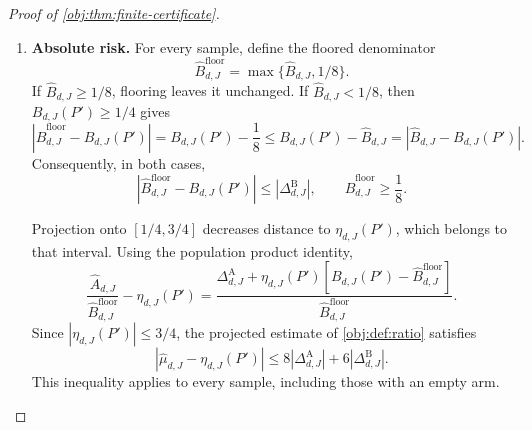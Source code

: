 \begin{proof}[Proof of \cref{obj:thm:finite-certificate}]
\begin{enumerate}
For \(x\in[0,1]\), reflection preserves the distance from zero. Thus
\cref{obj:ass:mean-holder} gives
\[
|\mu_d(P',s_dx)-\mu_d(P',0)|\le2x^\beta.
\]
Subtracting the cutoff mean inside the weighted integral yields
\[
\eta_{d,J}(P')-\mu_d(P',0)
=
\frac{
\int_0^1K_J(x)f(P',s_dx)
[\mu_d(P',s_dx)-\mu_d(P',0)]\,dx
}{B_{d,J}(P')}.
\]
The numerator satisfies
\[
\begin{aligned}
\left|
\int_0^1K_J(x)f(P',s_dx)
[\mu_d(P',s_dx)-\mu_d(P',0)]\,dx
\right|
&\le\int_0^1K_J(x)f(P',s_dx)\,2x^\beta\,dx\\
&\le\frac32M_{J,\beta}.
\end{aligned}
\]
Since \(M_{J,\beta}\ge0\) and \(B_{d,J}(P')\ge1/4\), it follows that
\[
|\eta_{d,J}(P')-\mu_d(P',0)|\le6M_{J,\beta}.
\]
Together with the expectation identity above, this also proves the required lower bound on each unmarked population expectation.

\item \textbf{Absolute risk.}
For every sample, define the floored denominator
\[
\widehat B^{\mathrm{floor}}_{d,J}
=\max\{\widehat B_{d,J},1/8\}.
\]
If \(\widehat B_{d,J}\ge1/8\), flooring leaves it unchanged. If
\(\widehat B_{d,J}<1/8\), then \(B_{d,J}(P')\ge1/4\) gives
\[
\left|\widehat B^{\mathrm{floor}}_{d,J}-B_{d,J}(P')\right|
=B_{d,J}(P')-\frac18
\le B_{d,J}(P')-\widehat B_{d,J}
=\left|\widehat B_{d,J}-B_{d,J}(P')\right|.
\]
Consequently, in both cases,
\[
\left|\widehat B^{\mathrm{floor}}_{d,J}-B_{d,J}(P')\right|
\le|\Delta^{\mathrm B}_{d,J}|,
\qquad
\widehat B^{\mathrm{floor}}_{d,J}\ge\frac18.
\]

Projection onto \([1/4,3/4]\) decreases distance to
\(\eta_{d,J}(P')\), which belongs to that interval. Using the population product identity,
\[
\frac{\widehat A_{d,J}}{\widehat B^{\mathrm{floor}}_{d,J}}
-\eta_{d,J}(P')
=
\frac{
\Delta^{\mathrm A}_{d,J}
+\eta_{d,J}(P')
[B_{d,J}(P')-\widehat B^{\mathrm{floor}}_{d,J}]
}{\widehat B^{\mathrm{floor}}_{d,J}}.
\]
Since \(|\eta_{d,J}(P')|\le3/4\), the projected estimate of
\cref{obj:def:ratio} satisfies
\[
|\widehat\mu_{d,J}-\eta_{d,J}(P')|
\le8|\Delta^{\mathrm A}_{d,J}|
+6|\Delta^{\mathrm B}_{d,J}|.
\]
This inequality applies to every sample, including those with an empty arm.


\end{enumerate}
\end{proof}
